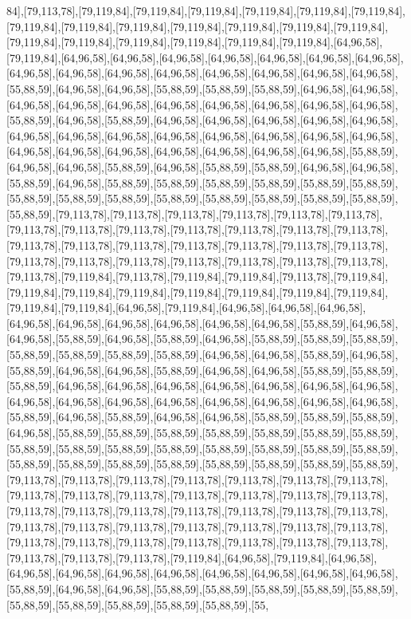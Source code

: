 84],[79,113,78],[79,119,84],[79,119,84],[79,119,84],[79,119,84],[79,119,84],[79,119,84],[79,119,84],[79,119,84],[79,119,84],[79,119,84],[79,119,84],[79,119,84],[79,119,84],[79,119,84],[79,119,84],[79,119,84],[79,119,84],[79,119,84],[79,119,84],[64,96,58],[79,119,84],[64,96,58],[64,96,58],[64,96,58],[64,96,58],[64,96,58],[64,96,58],[64,96,58],[64,96,58],[64,96,58],[64,96,58],[64,96,58],[64,96,58],[64,96,58],[64,96,58],[64,96,58],[55,88,59],[64,96,58],[64,96,58],[55,88,59],[55,88,59],[55,88,59],[64,96,58],[64,96,58],[64,96,58],[64,96,58],[64,96,58],[64,96,58],[64,96,58],[64,96,58],[64,96,58],[64,96,58],[55,88,59],[64,96,58],[55,88,59],[64,96,58],[64,96,58],[64,96,58],[64,96,58],[64,96,58],[64,96,58],[64,96,58],[64,96,58],[64,96,58],[64,96,58],[64,96,58],[64,96,58],[64,96,58],[64,96,58],[64,96,58],[64,96,58],[64,96,58],[64,96,58],[64,96,58],[64,96,58],[55,88,59],[64,96,58],[64,96,58],[55,88,59],[64,96,58],[55,88,59],[55,88,59],[64,96,58],[64,96,58],[55,88,59],[64,96,58],[55,88,59],[55,88,59],[55,88,59],[55,88,59],[55,88,59],[55,88,59],[55,88,59],[55,88,59],[55,88,59],[55,88,59],[55,88,59],[55,88,59],[55,88,59],[55,88,59],[55,88,59],[79,113,78],[79,113,78],[79,113,78],[79,113,78],[79,113,78],[79,113,78],[79,113,78],[79,113,78],[79,113,78],[79,113,78],[79,113,78],[79,113,78],[79,113,78],[79,113,78],[79,113,78],[79,113,78],[79,113,78],[79,113,78],[79,113,78],[79,113,78],[79,113,78],[79,113,78],[79,113,78],[79,113,78],[79,113,78],[79,113,78],[79,113,78],[79,113,78],[79,119,84],[79,113,78],[79,119,84],[79,119,84],[79,113,78],[79,119,84],[79,119,84],[79,119,84],[79,119,84],[79,119,84],[79,119,84],[79,119,84],[79,119,84],[79,119,84],[79,119,84],[64,96,58],[79,119,84],[64,96,58],[64,96,58],[64,96,58],[64,96,58],[64,96,58],[64,96,58],[64,96,58],[64,96,58],[64,96,58],[55,88,59],[64,96,58],[64,96,58],[55,88,59],[64,96,58],[55,88,59],[64,96,58],[55,88,59],[55,88,59],[55,88,59],[55,88,59],[55,88,59],[55,88,59],[55,88,59],[64,96,58],[64,96,58],[55,88,59],[64,96,58],[55,88,59],[64,96,58],[64,96,58],[55,88,59],[64,96,58],[64,96,58],[55,88,59],[55,88,59],[55,88,59],[64,96,58],[64,96,58],[64,96,58],[64,96,58],[64,96,58],[64,96,58],[64,96,58],[64,96,58],[64,96,58],[64,96,58],[64,96,58],[64,96,58],[64,96,58],[64,96,58],[64,96,58],[55,88,59],[64,96,58],[55,88,59],[64,96,58],[64,96,58],[55,88,59],[55,88,59],[55,88,59],[64,96,58],[55,88,59],[55,88,59],[55,88,59],[55,88,59],[55,88,59],[55,88,59],[55,88,59],[55,88,59],[55,88,59],[55,88,59],[55,88,59],[55,88,59],[55,88,59],[55,88,59],[55,88,59],[55,88,59],[55,88,59],[55,88,59],[55,88,59],[55,88,59],[55,88,59],[55,88,59],[55,88,59],[79,113,78],[79,113,78],[79,113,78],[79,113,78],[79,113,78],[79,113,78],[79,113,78],[79,113,78],[79,113,78],[79,113,78],[79,113,78],[79,113,78],[79,113,78],[79,113,78],[79,113,78],[79,113,78],[79,113,78],[79,113,78],[79,113,78],[79,113,78],[79,113,78],[79,113,78],[79,113,78],[79,113,78],[79,113,78],[79,113,78],[79,113,78],[79,113,78],[79,113,78],[79,113,78],[79,113,78],[79,113,78],[79,113,78],[79,113,78],[79,113,78],[79,113,78],[79,113,78],[79,113,78],[79,119,84],[64,96,58],[79,119,84],[64,96,58],[64,96,58],[64,96,58],[64,96,58],[64,96,58],[64,96,58],[64,96,58],[64,96,58],[64,96,58],[55,88,59],[64,96,58],[64,96,58],[55,88,59],[55,88,59],[55,88,59],[55,88,59],[55,88,59],[55,88,59],[55,88,59],[55,88,59],[55,88,59],[55,88,59],[55,